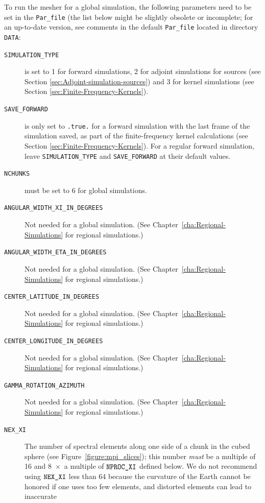 To run the mesher for a global simulation, the following parameters
need to be set in the \texttt{Par\_file} (the list below might be slightly obsolete or incomplete; for an up-to-date
version, see comments in the default \texttt{Par\_file} located in directory \texttt{DATA}:


\begin{description}
\item [{\texttt{SIMULATION\_TYPE}}] is set to 1 for forward simulations,
2 for adjoint simulations for sources (see Section \ref{sec:Adjoint-simulation-sources})
and 3 for kernel simulations (see Section \ref{sec:Finite-Frequency-Kernels}).
%
\item [{\texttt{SAVE\_FORWARD}}] is only set to \texttt{.true.} for a forward
simulation with the last frame of the simulation saved, as part of
the finite-frequency kernel calculations (see Section \ref{sec:Finite-Frequency-Kernels}).
For a regular forward simulation, leave \texttt{SIMULATION\_TYPE}
and \texttt{SAVE\_FORWARD} at their default values.
%
\item [{\texttt{NCHUNKS}}] must be set to 6 for global simulations.
%
\item [{\texttt{ANGULAR\_WIDTH\_XI\_IN\_DEGREES}}] Not needed for a global
simulation. (See Chapter~\ref{cha:Regional-Simulations} for regional simulations.)
%
\item [{\texttt{ANGULAR\_WIDTH\_ETA\_IN\_DEGREES}}] Not needed for a global
simulation. (See Chapter~\ref{cha:Regional-Simulations} for regional simulations.)
%
\item [{\texttt{CENTER\_LATITUDE\_IN\_DEGREES}}] Not needed for a global
simulation. (See Chapter~\ref{cha:Regional-Simulations} for regional simulations.)
%
\item [{\texttt{CENTER\_LONGITUDE\_IN\_DEGREES}}] Not needed for a global
simulation. (See Chapter~\ref{cha:Regional-Simulations} for regional simulations.)
%
\item [{\texttt{GAMMA\_ROTATION\_AZIMUTH}}] Not needed for a global simulation.
(See Chapter~\ref{cha:Regional-Simulations}  for regional simulations.)
%
\item [{\texttt{NEX\_XI}}] The number of spectral elements along one side of a
chunk in the cubed sphere (see Figure~\ref{figure:mpi_slices});
this number \textit{must} be a multiple of 16 and 8~$\times$~a
multiple of $\mbox{\texttt{NPROC\_XI}}$ defined below. We do not recommend using $\mbox{\texttt{NEX\_XI}}$
less than 64 because the curvature of the Earth cannot be honored
if one uses too few elements, and distorted elements can lead to inaccurate

\end{description}
